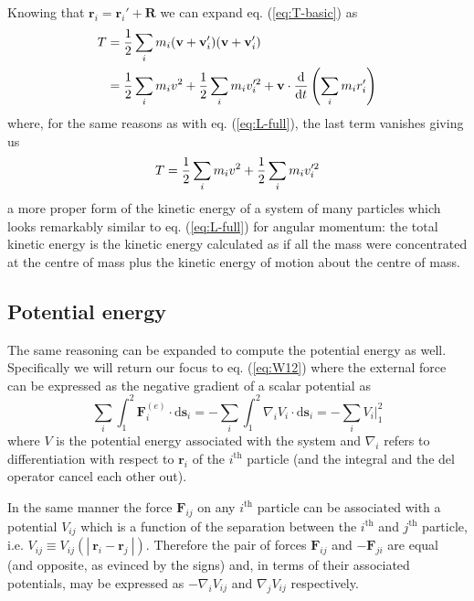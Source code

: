 \documentclass[english,seminar,headertitle]{lecture}
\begin{document}
Knowing that $\mathbf{r}_i = \mathbf{r}_i' + \mathbf{R}$ we can expand eq. (\ref{eq:T-basic}) as
\begin{align*}
T &= {1 \over 2} \sum_i m_i (\mathbf{v} + \mathbf{v}_i')(\mathbf{v} + \mathbf{v}_i') \\
&= {1 \over 2} \sum_i m_i v^2 + {1 \over 2} \sum_i m_i v_i'^2 + \mathbf{v} \cdot {\textrm{d}\over\textrm{d}t} \left( \sum_i m_i r_i' \right)
\end{align*}%
where, for the same reasons as with eq. (\ref{eq:L-full}), the last term vanishes giving us
\begin{equation}
	T = {1 \over 2} \sum_i m_i v^2 + {1 \over 2} \sum_i m_i v_i'^2 \label{eq:T}
\end{equation}%
a more proper form of the kinetic energy of a system of many particles which looks remarkably similar to eq. (\ref{eq:L-full}) for angular momentum: the total kinetic energy is the kinetic energy calculated as if all the mass were concentrated at the centre of mass plus the kinetic energy of motion about the centre of mass.
%
\subsection{Potential energy}
%
The same reasoning can be expanded to compute the potential energy as well. Specifically we will return our focus to eq. (\ref{eq:W12}) where the external force can be expressed as the negative gradient of a scalar potential as
$$
\sum_i \int_1^2 \mathbf{F}_i^{(e)}\cdot\textrm{d}\mathbf{s}_i = - \sum_i \int_1^2 \nabla_i V_i \cdot \textrm{d}\mathbf{s}_i = - \sum_i V_i \Bigr|_1^2
$$
where $V$ is the potential energy associated with the system and $\nabla_i$ refers to differentiation with respect to $\mathbf{r}_i$ of the $i^\textrm{th}$ particle (and the integral and the del operator cancel each other out).

In the same manner the force $\mathbf{F}_{ij}$ on any $i^\textrm{th}$ particle can be associated with a potential $V_{ij}$ which is a function of the separation between the $i^\textrm{th}$ and $j^\textrm{th}$ particle, i.e. $V_{ij} \equiv V_{ij}(| \ \mathbf{r}_i - \mathbf{r}_j \ |)$. Therefore the pair of forces $\mathbf{F}_{ij}$ and $-\mathbf{F}_{ji}$ are equal (and opposite, as evinced by the signs) and, in terms of their associated potentials, may be expressed as $-\nabla_i V_{ij}$ and $\nabla_j V_{ij}$ respectively.
\end{document}
